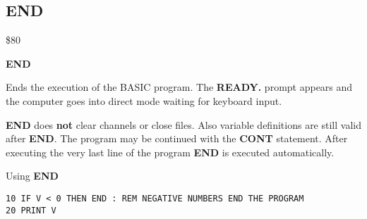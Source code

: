 \subsection{END}
\begin{description}[leftmargin=2cm,style=nextline]
\item [Token:] \$80
\item [Format:] {\bf END}
\item [Usage:] Ends the execution
               of the BASIC program. The {\bf READY.} prompt
               appears and the computer goes into direct mode
               waiting for keyboard input.

\item [Remarks:]
               {\bf END} does {\bf not} clear channels or close files.
               Also variable definitions are still valid after {\bf END}.
               The program may be continued with the {\bf CONT}
               statement. After executing the very last line of the
               program {\bf END} is executed automatically.


\item [Example:]
                Using {\bf END}
\begin{tcolorbox}[colback=black,coltext=white]
\verbatimfont{\codefont}
\begin{verbatim}
10 IF V < 0 THEN END : REM NEGATIVE NUMBERS END THE PROGRAM
20 PRINT V
\end{verbatim}
\end{tcolorbox}
\end{description}


\newpage
